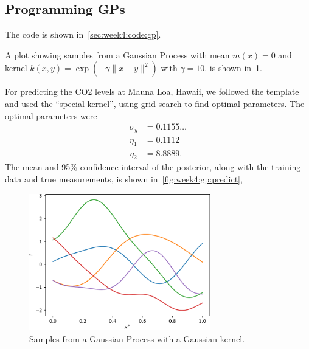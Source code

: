 \subsection{Programming GPs}

The code is shown in~\cref{sec:week4:code:gp}.

A plot showing samples from a Gaussian Process
with mean $m(x) = 0$ and kernel
$k(x, y) = \exp{\left( -\gamma \parallel x - y \parallel^2 \right)}$
with $\gamma = 10$.
is shown in~\cref{fig:week4:gp:gp-samples}.

For predicting the CO2 levels at Mauna Loa, Hawaii,
we followed the template and used the ``special kernel'',
using grid search to find optimal parameters.
The optimal parameters were
\begin{align*}
  \sigma_y &= 0.1155\ldots \\
  \eta_1 &= 0.1112 \\
  \eta_2 &= 8.8889.
\end{align*}
The mean and 95\% confidence interval of the posterior,
along with the training data and true measurements,
is shown in~\cref{fig:week4:gp:predict},

\begin{figure}[htbp]
  \centering
  \includegraphics[width=0.7\textwidth]{./figures/gp_samples.pdf}
  \caption{Samples from a Gaussian Process with a Gaussian kernel.}
  \label{fig:week4:gp:gp-samples}
\end{figure}

